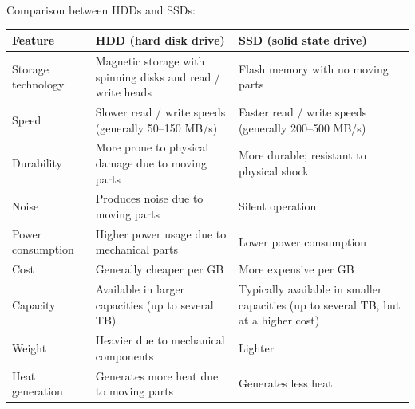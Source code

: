 \documentclass[a4paper,12pt]{article}
\begin{document}
Comparison between HDDs and SSDs:
\begin{center}
\begin{tabular}{|p{4cm}|p{6.5cm}|p{6.5cm}|}
        \hline
        \textbf{Feature} & \textbf{HDD (hard disk drive)} & \textbf{SSD (solid state drive)} \\
        \hline
        Storage technology & Magnetic storage with spinning disks and read / write heads & Flash memory with no moving parts \\
        \hline
        Speed & Slower read / write speeds (generally 50--150 MB/s) & Faster read / write speeds (generally 200--500 MB/s) \\
        \hline
        Durability & More prone to physical damage due to moving parts & More durable; resistant to physical shock \\
        \hline
        Noise & Produces noise due to moving parts & Silent operation \\
        \hline
        Power consumption & Higher power usage due to mechanical parts & Lower power consumption \\
        \hline
        Cost & Generally cheaper per GB & More expensive per GB \\
        \hline
        Capacity & Available in larger capacities (up to several TB) & Typically available in smaller capacities (up to several TB, but at a higher cost) \\
        \hline
        Weight & Heavier due to mechanical components & Lighter \\
        \hline
        Heat generation & Generates more heat due to moving parts & Generates less heat \\
        \hline
    \end{tabular}
\end{center}
\end{document}
